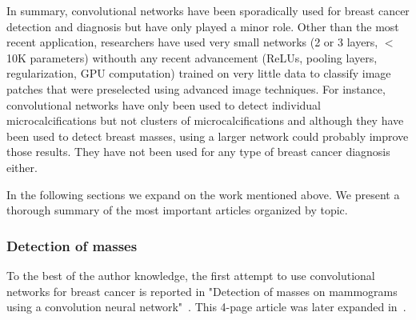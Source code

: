 In summary, convolutional networks have been sporadically used for breast cancer detection and diagnosis but have only played a minor role. Other than the most recent application, researchers have used very small networks (2 or 3 layers, $<$10K parameters) withouth any recent advancement (ReLUs, pooling layers, regularization, GPU computation) trained on very little data to classify image patches that were preselected using advanced image techniques. For instance, convolutional networks have only been used to detect individual microcalcifications but not clusters of microcalcifications and although they have been used to detect breast masses, using a larger network could probably improve those results. They have not been used for any type of breast cancer diagnosis either.

In the following sections we expand on the work mentioned above. We present a thorough summary of the most important articles organized by topic.

\begin{comment}
Separated in blocks:
	1. Initial mass: Sahiran 1996 (michigan)
	2. Intial microcalc detection: Lo 1995- Lo 1998 (georgetown/both)
	3. Optimal architecture for microcalc: Gurcan 2000-Gurcan 2002 (michigan)
	4. CAD for microcalcification in FFDM. Ge 2007 (CAD for masses didn't use Convnets, used LDA and rule-based classifiers). (michigan)
	5. Unpublished Stanford convnet: Agarwal 2015 (stanford)
\end{comment}

\subsubsection{Detection of masses}
To the best of the author knowledge, the first attempt to use convolutional networks for breast cancer is reported in "Detection of masses on mammograms using a convolution neural network"~\cite{Wei1995}. This 4-page article was later expanded in~\cite{Sahiner1996}.

